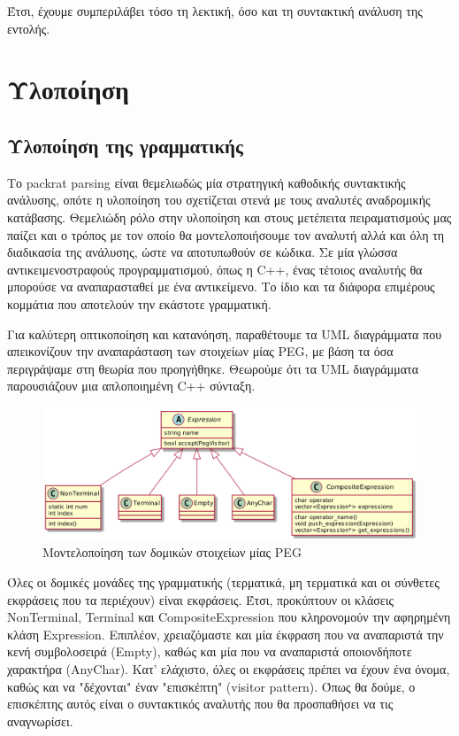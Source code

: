 Έτσι, έχουμε συμπεριλάβει τόσο τη λεκτική, όσο και τη συντακτική ανάλυση της εντολής.

\section{Υλοποίηση}

\subsection{Υλοποίηση της γραμματικής}
Το packrat parsing είναι θεμελιωδώς μία στρατηγική καθοδικής συντακτικής ανάλυσης, οπότε η υλοποίηση του σχετίζεται στενά με τους αναλυτές αναδρομικής κατάβασης. 
Θεμελιώδη ρόλο στην υλοποίηση και στους μετέπειτα πειραματισμούς μας παίζει και ο τρόπος με τον οποίο θα μοντελοποιήσουμε τον αναλυτή αλλά και όλη τη διαδικασία της ανάλυσης, ώστε να αποτυπωθούν σε κώδικα. 
Σε μία γλώσσα αντικειμενοστραφούς προγραμματισμού, όπως η C++, ένας τέτοιος αναλυτής θα μπορούσε να αναπαρασταθεί με ένα αντικείμενο. Το ίδιο και τα διάφορα επιμέρους κομμάτια που αποτελούν την εκάστοτε γραμματική. 

Για καλύτερη οπτικοποίηση και κατανόηση, παραθέτουμε τα UML διαγράμματα που απεικονίζουν την αναπαράσταση των στοιχείων μίας PEG, με βάση τα όσα περιγράψαμε στη θεωρία που προηγήθηκε. Θεωρούμε ότι τα UML διαγράμματα παρουσιάζουν μια απλοποιημένη C++ σύνταξη.

\begin{figure}[h]
    \centering
	\includegraphics[width=1.10\textwidth]{uml/peg_elements}
	\caption{Μοντελοποίηση των δομικών στοιχείων μίας PEG}
    \label{fig:peg_elements}
\end{figure}

Όλες οι δομικές μονάδες της γραμματικής (τερματικά, μη τερματικά και οι σύνθετες εκφράσεις που τα περιέχουν) είναι εκφράσεις. 
Έτσι, προκύπτουν οι κλάσεις NonTerminal, Terminal και CompositeExpression που κληρονομούν την αφηρημένη κλάση Expression.
Επιπλέον, χρειαζόμαστε και μία έκφραση που να αναπαριστά την κενή συμβολοσειρά (Empty), καθώς και μία που να αναπαριστά οποιονδήποτε χαρακτήρα (AnyChar).
Κατ' ελάχιστο, όλες οι εκφράσεις πρέπει να έχουν ένα όνομα, καθώς και να "δέχονται" έναν "επισκέπτη" (visitor pattern).
Όπως θα δούμε, ο επισκέπτης αυτός είναι ο συντακτικός αναλυτής που θα προσπαθήσει να τις αναγνωρίσει.

